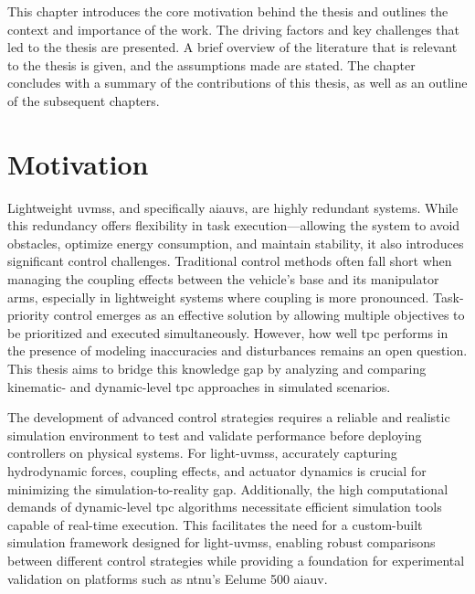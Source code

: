 \label{ch:introduction}
This chapter introduces the core motivation behind the thesis and outlines the
context and importance of the work. The driving factors and key challenges that
led to the thesis are presented. A brief overview of the literature that is
relevant to the thesis is given, and the assumptions made are
stated. The chapter concludes with a summary of the contributions of this thesis,
as well as an outline of the subsequent chapters.


\section{Motivation}
\label{sec:introduction:motivation}

{
\color{red}
Lightweight \gls{uvms}s, and specifically \gls{aiauv}s, are highly redundant systems.
While this redundancy offers flexibility in task execution—allowing the system
to avoid obstacles, optimize 
energy consumption, and maintain stability, it also introduces significant 
control challenges. Traditional control methods often fall short when managing 
the coupling effects between the vehicle's base and its manipulator arms, 
especially in lightweight systems where coupling is more pronounced. 
Task-priority control emerges as an effective solution by allowing 
multiple objectives to be prioritized and executed simultaneously. However, how 
well \gls{tpc} performs in the presence of modeling inaccuracies and disturbances 
remains an open question. This thesis aims to bridge this knowledge gap by 
analyzing and comparing kinematic- and dynamic-level \gls{tpc} approaches in
simulated scenarios.

The development of advanced control strategies requires a reliable and 
realistic simulation environment to test and validate performance before 
deploying controllers on physical systems. For light-\gls{uvms}s, accurately 
capturing hydrodynamic forces, coupling effects, and actuator dynamics is 
crucial for minimizing the simulation-to-reality gap. Additionally, the high 
computational demands of dynamic-level \gls{tpc} algorithms necessitate efficient 
simulation tools capable of real-time execution. This facilitates the
need for a custom-built simulation framework designed for light-\gls{uvms}s, 
enabling robust comparisons between different control strategies while 
providing a foundation for experimental validation on platforms such as \gls{ntnu}’s 
Eelume 500 \gls{aiauv}.
}

